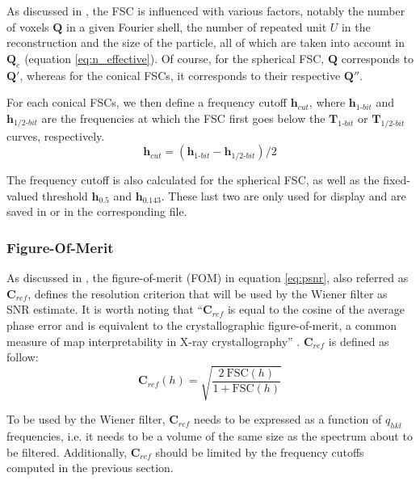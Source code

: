 As discussed in \cite{fsc_mvh}, the FSC is influenced with various factors, notably the number of voxels $\bm{Q}$ in a given Fourier shell, the number of repeated unit $U$ in the reconstruction and the size of the particle, all of which are taken into account in $\bm{Q}_{e}$ (equation \ref{eq:n_effective}). Of course, for the spherical FSC, $\bm{Q}$ corresponds to $\bm{Q'}$, whereas for the conical FSCs, it corresponds to their respective $\bm{Q''}$.

For each conical FSCs, we then define a frequency cutoff $\bm{h}_{cut}$, where $\bm{h}_{1\text{-}bit}$ and $\bm{h}_{1/2\text{-}bit}$ are the frequencies at which the FSC first goes below the $\bm{T}_{1\text{-}bit}$ or $\bm{T}_{1/2\text{-}bit}$ curves, respectively.
\begin{equation} \label{eq:hcut}
    \bm{h}_{cut} = (\bm{h}_{1\text{-}bit} - \bm{h}_{1/2\text{-}bit}) / 2
\end{equation}

The frequency cutoff is also calculated for the spherical FSC, as well as the fixed-valued threshold $\bm{h}_{0.5}$ and $\bm{h}_{0.143}$. These last two are only used for display and are saved in  or in the corresponding  file.

\subsubsection{Figure-Of-Merit} \label{sec:algo:avg:fom}

As discussed in \cite{rosenthal_2003}, the figure-of-merit (FOM) in equation \ref{eq:psnr}, also referred as $\bm{C}_{ref}$, defines the resolution criterion that will be used by the Wiener filter as SNR estimate. It is worth noting that ``$\bm{C}_{ref}$ is equal to the cosine of the average phase error and is equivalent to the crystallographic figure-of-merit, a common measure of map interpretability in X-ray crystallography'' \cite{rosenthal_2003}. $\bm{C}_{ref}$ is defined as follow:
\begin{equation} \label{eq:cref}
    \bm{C}_{ref}(h) = \sqrt{\dfrac{2\ \bm{\mathrm{FSC}}(h)}{1+\bm{\mathrm{FSC}}(h)}}
\end{equation}

To be used by the Wiener filter, $\bm{C}_{ref}$ needs to be expressed as a function of $q_{hkl}$ frequencies, i.e. it needs to be a volume of the same size as the spectrum about to be filtered. Additionally, $\bm{C}_{ref}$ should be limited by the frequency cutoffs computed in the previous section.

